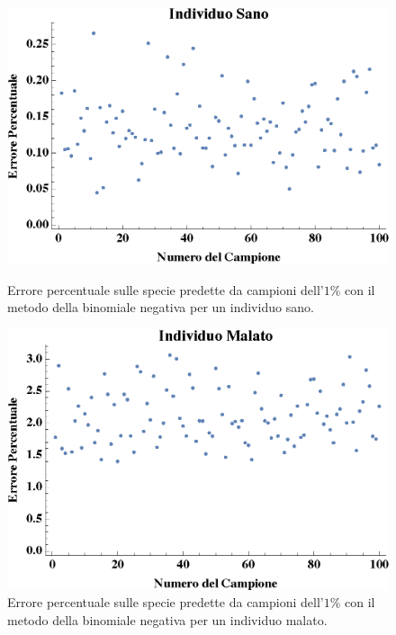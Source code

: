 \begin{figure}[H]
  \centering
  \begin{minipage}[b]{0.4\textwidth}
    \includegraphics[width=\textwidth]{Figure/erroriHtets.eps}
    \caption{Errore percentuale sulle specie predette da campioni dell'$1 \% $  con il metodo della binomiale negativa per un individuo sano.}
    \label{fig:erroriH}
  \end{minipage}
  \hfill
  \begin{minipage}[b]{0.4\textwidth}
    \includegraphics[width=\textwidth]{Figure/erroriCtest.eps}
    \caption{Errore percentuale sulle specie predette da campioni dell'$1 \% $ con il metodo della binomiale negativa per un individuo malato.}
    \label{fig:erroriC}
  \end{minipage}
\end{figure}

